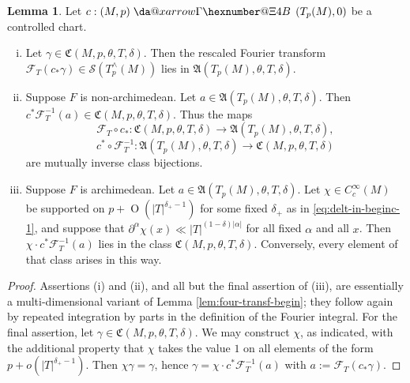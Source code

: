 \documentclass[reqno]{amsart}
\makeatletter
\newcommand*{\da@rightarrow}{\mathchar"0\hexnumber@\symAMSa 4B }
\newcommand*{\xdashrightarrow}[2][]{%
  \mathrel{%
    \mathpalette{\da@xarrow{#1}{#2}{}\da@rightarrow{\,}{}}{}%
  }%
}
\newcommand*{\da@xarrow}[7]{%
  \sbox0{$\ifx#7\scriptstyle\scriptscriptstyle\else\scriptstyle\fi#5#1#6\m@th$}%
  \sbox2{$\ifx#7\scriptstyle\scriptscriptstyle\else\scriptstyle\fi#5#2#6\m@th$}%
  \sbox4{$#7\dabar@\m@th$}%
  \dimen@=\wd0 %
  \ifdim\wd2 >\dimen@
    \dimen@=\wd2 %
  \fi
  \count@=2 %
  \def\da@bars{\dabar@\dabar@}%
  \@whiledim\count@\wd4<\dimen@\do{%
    \advance\count@\@ne
    \expandafter\def\expandafter\da@bars\expandafter{%
      \da@bars
      \dabar@ 
    }%
  }%
  \mathrel{#3}%
  \mathrel{%
    \mathop{\da@bars}\limits
    \ifx\\#1\\%
    \else
      _{\copy0}%
    \fi
    \ifx\\#2\\%
    \else
      ^{\copy2}%
    \fi
  }%
  \mathrel{#4}%
}
\def\O{\operatorname{O}}
\theoremstyle{plain} \newtheorem{theorem} {Theorem}
\theoremstyle{definition} \newtheorem{definition} [theorem] {Definition}
\theoremstyle{itplain} %
\newtheorem{lemma}[theorem]{Lemma}
\numberwithin{equation}{section}
\numberwithin{theorem}{section}
\makeatother
\begin{document}
\begin{lemma}\label{lem:let-c-frakC-vs-frakA}
  Let $c : (M,p) \xdashrightarrow{} (T_p(M), 0)$ be a controlled chart.
  \begin{enumerate}[(i)]
  \item Let $\gamma \in \mathfrak{C}(M,p,\theta,T,\delta)$.  Then the rescaled Fourier transform $\mathcal{F}_T(c_*\gamma) \in \mathcal{S}(T_p^\wedge(M))$ lies in $\mathfrak{A}(T_p(M),\theta,T,\delta)$.
  \item Suppose $F$ is non-archimedean.   Let $a \in \mathfrak{A}(T_p(M),\theta,T,\delta)$.  Then $c^* \mathcal{F}_T^{-1}(a) \in \mathfrak{C}(M,p,\theta,T,\delta)$.  Thus the maps
    \begin{equation*}
      \mathcal{F}_T \circ c_* : \mathfrak{C}(M,p,\theta,T,\delta) \rightarrow \mathfrak{A}(T_p(M),\theta,T,\delta),
    \end{equation*}
    \begin{equation*}
      c^* \circ \mathcal{F}_T^{-1}  : \mathfrak{A}(T_p(M),\theta,T,\delta) \rightarrow \mathfrak{C}(M,p,\theta,T,\delta)
    \end{equation*}
    are mutually inverse class bijections.
  \item \label{itm:standard:fourier-description-of-bumps-arch} Suppose $F$ is archimedean.  Let $a \in \mathfrak{A}(T_p(M),\theta,T,\delta)$.  Let $\chi \in C_c^\infty(M)$ be supported on $p + \O(|T|^{\delta_+-1})$ for some fixed $\delta_+$ as in \eqref{eq:delt-in-beginc-1}, and suppose that $\partial^\alpha \chi(x) \ll |T|^{(1 - \delta) |\alpha|}$ for all fixed $\alpha$ and all $x$.  Then $\chi \cdot c^* \mathcal{F}_T^{-1}(a)$ lies in the class $\mathfrak{C}(M,p,\theta,T,\delta)$.  Conversely, every element of that class arises in this way.
  \end{enumerate}
\end{lemma}
\begin{proof}
  Assertions (i) and (ii), and all but the final assertion of (iii), are essentially a multi-dimensional variant of Lemma \ref{lem:four-transf-begin}; they follow again by repeated integration by parts in the definition of the Fourier integral.  For the final assertion, let $\gamma \in \mathfrak{C}(M,p,\theta,T,\delta)$.  We may construct $\chi$, as indicated, with the additional property that $\chi$ takes the value $1$ on all elements of the form $p + o(|T|^{\delta_+-1})$.  Then $\chi \gamma = \gamma$, hence $\gamma = \chi \cdot c^* \mathcal{F}_T^{-1} (a)$ with $a := \mathcal{F}_T (c_* \gamma)$.
\end{proof}
\end{document}
